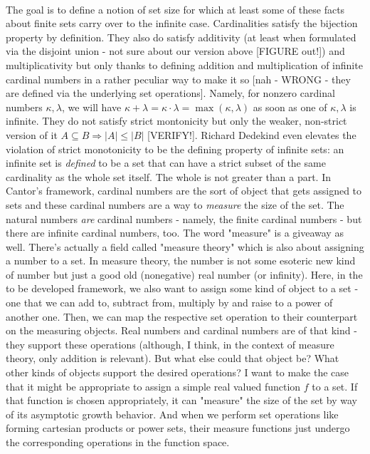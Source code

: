 \documentclass[12pt]{article}
\begin{document}
\paragraph{} The goal is to define a notion of set size for which at least some of these facts about finite sets carry over to the infinite case. Cardinalities satisfy the bijection property by definition. They also do satisfy additivity (at least when formulated via the disjoint union - not sure about our version above [FIGURE out!]) and multiplicativity but only thanks to defining addition and multiplication of infinite cardinal numbers in a rather peculiar way to make it so [nah - WRONG - they are defined via the underlying set operations]. Namely, for nonzero cardinal numbers $\kappa, \lambda$, we will have $\kappa + \lambda = \kappa \cdot \lambda = \max(\kappa, \lambda)$ as soon as one of $\kappa, \lambda$ is infinite. They do not satisfy strict montonicity but only the weaker, non-strict version of it $A \subseteq B \Rightarrow |A| \leq |B|$ [VERIFY!]. Richard Dedekind even elevates the violation of strict monotonicity to be the defining property of infinite sets: an infinite set is \emph{defined} to be a set that can have a strict subset of the same cardinality as the whole set itself. The whole is not greater than a part.
In Cantor's framework, cardinal numbers are the sort of object that gets assigned to sets and these cardinal numbers are a way to \emph{measure} the size of the set. The natural numbers \emph{are} cardinal numbers - namely, the finite cardinal numbers - but there are infinite cardinal numbers, too. The word "measure" is a giveaway as well. There's actually a field called "measure theory" which is also about assigning a number to a set. In measure theory, the number is not some esoteric new kind of number but just a good old (nonegative) real number (or infinity). Here, in the to be developed framework, we also want to assign some kind of object to a set - one that we can add to, subtract from, multiply by and raise to a power of another one. Then, we can map the respective set operation to their counterpart on the measuring objects. Real numbers and cardinal numbers are of that kind - they support these operations (although, I think, in the context of measure theory, only addition is relevant). But what else could that object be? What other kinds of objects support the desired operations? I want to make the case that it might be appropriate to assign a simple real valued function $f$ to a set. If that function is chosen appropriately, it can "measure" the size of the set by way of its asymptotic growth behavior. And when we perform set operations like forming cartesian products or power sets, their measure functions just undergo the corresponding operations in the function space. %
\end{document}
